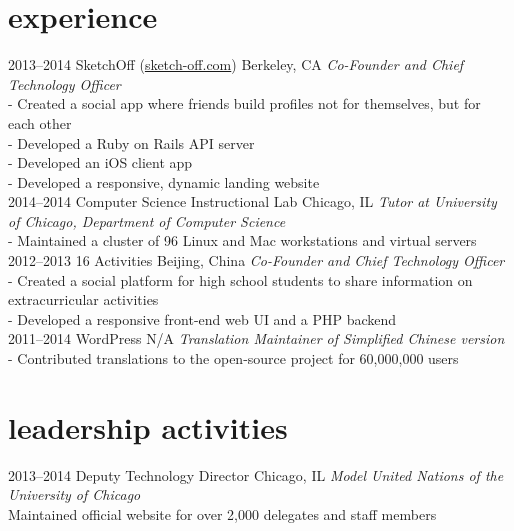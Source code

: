 \section{experience}

\begin{entrylist}
\entry
{2013--2014}
{SketchOff \quad\normalfont (\underline{sketch-off.com})}
{Berkeley, CA}
{\emph{Co-Founder and Chief Technology Officer} \\
- Created a social app where friends build profiles not for themselves, but for each other \\
- Developed a Ruby on Rails API server \\
- Developed an iOS client app \\
- Developed a responsive, dynamic landing website \\}
\entry
{2014--2014}
{Computer Science Instructional Lab}
{Chicago, IL}
{\emph{Tutor at University of Chicago, Department of Computer Science} \\
- Maintained a cluster of 96 Linux and Mac workstations and virtual servers\\}
\entry
{2012--2013}
{16 Activities}
{Beijing, China}
{\emph{Co-Founder and Chief Technology Officer} \\
- Created a social platform for high school students to share information on extracurricular activities \\
- Developed a responsive front-end web UI and a PHP backend \\}
\entry
{2011--2014}
{WordPress}
{N/A}
{\emph{Translation Maintainer of Simplified Chinese version} \\
-   Contributed translations to the open-source project for 60,000,000 users \\}
\end{entrylist}

\section{leadership activities}

\begin{entrylist}
\entry
{2013--2014}
{Deputy Technology Director}
{Chicago, IL}
{\emph{Model United Nations of the University of Chicago} \\
Maintained official website for over 2,000 delegates and staff members \\}
\end{entrylist}

